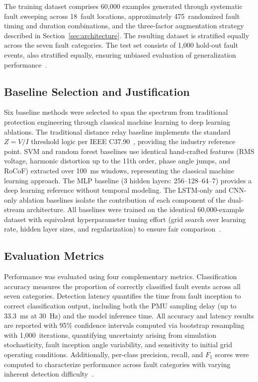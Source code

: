 \documentclass[journal]{IEEEtran}
\begin{document}
The training dataset comprises 60,000 examples generated through systematic fault sweeping across 18~fault locations, approximately 475~randomized fault timing and duration combinations, and the three-factor augmentation strategy described in Section~\ref{sec:architecture}. The resulting dataset is stratified equally across the seven fault categories. The test set consists of 1,000 hold-out fault events, also stratified equally, ensuring unbiased evaluation of generalization performance~\cite{ref27}.

\subsection{Baseline Selection and Justification}

Six baseline methods were selected to span the spectrum from traditional protection engineering through classical machine learning to deep learning ablations. The traditional distance relay baseline implements the standard $Z = V/I$ threshold logic per IEEE C37.90~\cite{ref3}, providing the industry reference point. SVM and random forest baselines use identical hand-crafted features (RMS voltage, harmonic distortion up to the 11th order, phase angle jumps, and RoCoF) extracted over 100~ms windows, representing the classical machine learning approach. The MLP baseline (3 hidden layers: 256--128--64--7) provides a deep learning reference without temporal modeling. The LSTM-only and CNN-only ablation baselines isolate the contribution of each component of the dual-stream architecture. All baselines were trained on the identical 60,000-example dataset with equivalent hyperparameter tuning effort (grid search over learning rate, hidden layer sizes, and regularization) to ensure fair comparison~\cite{ref35}.

\subsection{Evaluation Metrics}

Performance was evaluated using four complementary metrics. Classification accuracy measures the proportion of correctly classified fault events across all seven categories. Detection latency quantifies the time from fault inception to correct classification output, including both the PMU sampling delay (up to 33.3~ms at 30~Hz) and the model inference time. All accuracy and latency results are reported with 95\% confidence intervals computed via bootstrap resampling with 1,000~iterations, quantifying uncertainty arising from simulation stochasticity, fault inception angle variability, and sensitivity to initial grid operating conditions. Additionally, per-class precision, recall, and $F_1$ scores were computed to characterize performance across fault categories with varying inherent detection difficulty~\cite{ref36}.
\end{document}
